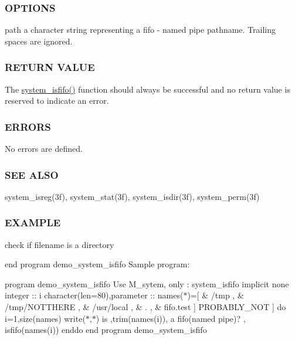 \subsubsection*{O\+P\+T\+I\+O\+NS}

path a character string representing a fifo -\/ named pipe pathname. Trailing spaces are ignored.

\subsubsection*{R\+E\+T\+U\+RN V\+A\+L\+UE}

The \hyperlink{namespacem__system_acbcaa0c5075ca103815f441ee410e1a3}{system\+\_\+isfifo()} function should always be successful and no return value is reserved to indicate an error.

\subsubsection*{E\+R\+R\+O\+RS}

No errors are defined.

\subsubsection*{S\+EE A\+L\+SO}

system\+\_\+isreg(3f), system\+\_\+stat(3f), system\+\_\+isdir(3f), system\+\_\+perm(3f)

\subsubsection*{E\+X\+A\+M\+P\+LE}

check if filename is a directory

end program demo\+\_\+system\+\_\+isfifo Sample program\+:

program demo\+\_\+system\+\_\+isfifo Use M\+\_\+sytem, only \+: system\+\_\+isfifo implicit none integer \+:\+: i character(len=80),parameter \+:\+: names($\ast$)=\mbox{[} \& \textquotesingle{}/tmp \textquotesingle{}, \& \textquotesingle{}/tmp/\+N\+O\+T\+T\+H\+E\+RE \textquotesingle{}, \& \textquotesingle{}/usr/local \textquotesingle{}, \& \textquotesingle{}. \textquotesingle{}, \& \textquotesingle{}fifo.\+test \textquotesingle{}\mbox{]} \textquotesingle{}P\+R\+O\+B\+A\+B\+L\+Y\+\_\+\+N\+OT \textquotesingle{}\mbox{]} do i=1,size(names) write($\ast$,$\ast$)\textquotesingle{} is \textquotesingle{},trim(names(i)),\textquotesingle{} a fifo(named pipe)? \textquotesingle{}, isfifo(names(i)) enddo end program demo\+\_\+system\+\_\+isfifo


